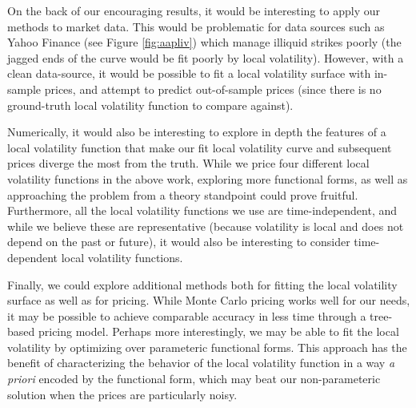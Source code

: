 \documentclass[11pt]{article}
\numberwithin{equation}{section}
\begin{document}
On the back of our encouraging results, it would be interesting to apply our
methods to market data. This would be problematic for data sources such as Yahoo
Finance (see Figure \ref{fig:aapliv}) which manage illiquid strikes poorly (the
jagged ends of the curve would be fit poorly by local volatility). However, with
a clean data-source, it would be possible to fit a local volatility surface with
in-sample prices, and attempt to predict out-of-sample prices (since there is no
ground-truth local volatility function to compare against).

Numerically, it would also be interesting to explore in depth the features of a
local volatility function that make our fit local volatility curve and
subsequent prices diverge the most from the truth. While we price four different
local volatility functions in the above work, exploring more functional forms,
as well as approaching the problem from a theory standpoint could prove
fruitful. Furthermore, all the local volatility functions we use are
time-independent, and while we believe these are representative (because
volatility is local and does not depend on the past or future), it would also be
interesting to consider time-dependent local volatility functions.

Finally, we could explore additional methods both for fitting the local
volatility surface as well as for pricing. While Monte Carlo pricing works well
for our needs, it may be possible to achieve comparable accuracy in less time
through a tree-based pricing model. Perhaps more interestingly, we may be able
to fit the local volatility by optimizing over parameteric functional forms.
This approach has the benefit of characterizing the behavior of the local
volatility function in a way \emph{a priori} encoded by the functional form,
which may beat our non-parameteric solution when the prices are particularly
noisy.





\newpage

\appendix
\appendixpage





\end{document}
